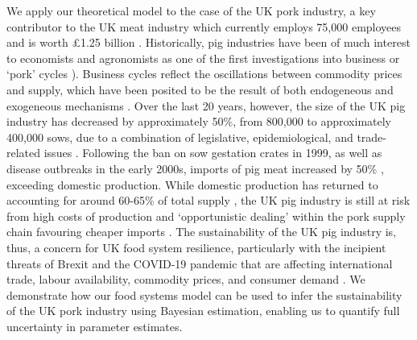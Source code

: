 \documentclass[9pt,twocolumn,twoside,lineno]{pnas-new}
\begin{document}
We apply our theoretical model to the case of the UK pork industry, a key contributor to the UK meat industry which currently employs 75,000 employees and is worth \pounds1.25 billion \cite{DEFRA2019auk18}. Historically, pig industries have been of much interest to economists and agronomists as one of the first investigations into business or `pork' cycles \cite{haldane1934,coase1935,ezekiel1938,harlow1960,meadows1971,zawadzka2010,parker2014,sterman2000}). Business cycles reflect the oscillations between commodity prices and supply, which have been posited to be the result of both endogeneous \cite{nerlove1958} and exogeneous mechanisms \cite{gouel2012}. Over the last 20 years, however, the size of the UK pig industry has decreased by approximately 50\%, from 800,000 to approximately 400,000 sows, due to a combination of legislative, epidemiological, and trade-related issues \cite{taylor2006,dawson2009}. Following the ban on sow gestation crates in 1999, as well as disease outbreaks in the early 2000s, imports of pig meat increased by 50\% \cite{DEFRApigcattlestats2020}, exceeding domestic production. While domestic production has returned to accounting for around 60-65\% of total supply \cite{DEFRApigcattlestats2020}, the UK pig industry is still at risk from high costs of production \cite{BPEXprofitability2011} and `opportunistic dealing' within the pork supply chain favouring cheaper imports \cite{bowman2013}. The sustainability of the UK pig industry is, thus, a concern for UK food system resilience, particularly with the incipient threats of Brexit and the COVID-19 pandemic that are affecting international trade, labour availability, commodity prices, and consumer demand \cite{power2020,feng2017,poppy2019}. We demonstrate how our food systems model can be used to infer the sustainability of the UK pork industry using Bayesian estimation, enabling us to quantify full uncertainty in parameter estimates.
\end{document}
